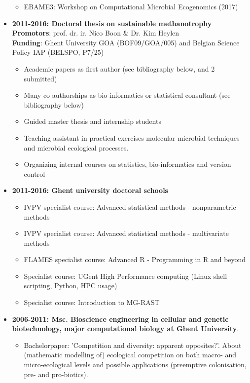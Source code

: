 \documentclass[a4paper,11pt,oneside]{article}
\begin{document}
\begin{itemize}
\begin{itemize}
      \item EBAME3: Workshop on Computational Microbial Ecogenomics (2017)
    \end{itemize}
\item \textbf{2011-2016: Doctoral thesis on sustainable methanotrophy}\\
\textbf{Promotors}: prof. dr. ir. Nico Boon \& Dr. Kim Heylen \\
\textbf{Funding}: Ghent University GOA (BOF09/GOA/005) and Belgian Science Policy IAP (BELSPO, P7/25)
    \begin{itemize}
      \item Academic papers as first author (see bibliography below, \cite{kerckhof2014optimized} and 2 submitted)
      \item Many co-authorships as bio-informatics or statistical consultant  (see bibliography below)
      \item Guided master thesis and internship students
      \item Teaching assistant in practical exercises molecular microbial techniques and microbial ecological processes.
      \item Organizing internal courses on statistics, bio-informatics and version control
    \end{itemize}
\item \textbf{2011-2016: Ghent university doctoral schools}
    \begin{itemize}
      \item IVPV specialist course: Advanced statistical methods - nonparametric methods
      \item IVPV specialist course: Advanced statistical methods - multivariate methods
      \item FLAMES specialist course: Advanced R - Programming in R and beyond
      \item Specialist course: UGent High Performance computing (Linux shell scripting, Python, HPC usage)
      \item Specialist course: Introduction to MG-RAST
    \end{itemize}
\item \textbf{2006-2011: Msc. Bioscience engineering in cellular and genetic biotechnology, major computational biology at Ghent University}. 
	\begin{itemize}
		\item Bachelorpaper: 'Competition and diversity: apparent opposites?'. About (mathematic modelling of) ecological competition on both macro- and micro-ecological levels and possible applications (preemptive colonisation, pre- and pro-biotics).

\end{itemize}
\end{itemize}
\end{document}
